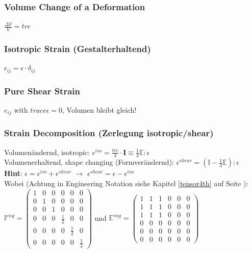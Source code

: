 	\subsubsection{Volume Change of a Deformation}
	$\frac{\Delta V}{V} = tr \epsilon $
	
	\subsubsection{Isotropic Strain (Gestalterhaltend)}
	$\epsilon_{ij} = \epsilon \cdot \delta_{ij} $
	
	\subsubsection{Pure Shear Strain}
	$e_{ij}$ with $trace \epsilon = 0$, Volumen bleibt gleich!
	
	\subsubsection{Strain Decomposition (Zerlegung isotropic/shear)}
	\label{straindecomposition}
	Volumenändernd, isotropic: $\epsilon^{iso} = \frac{tr \epsilon}{3} \cdot \mathbf{I}
	\equiv \frac{1}{3} \mathbb{E} : \epsilon$\\
	
	Volumenerhaltend, shape changing (Formverändernd): $\epsilon^{shear} =
	(\mathbb{I} - \frac{1}{3} \mathbb{E} ) : \epsilon $\\
	\textbf{Hint}: $\epsilon = \epsilon^{iso} + \epsilon^{shear}$ $\rightarrow$
	$\epsilon^{shear} = \epsilon -\epsilon^{iso}$\\
	Wobei (Achtung in Engineering
	Notation siehe Kapitel \ref{tensor4th} auf Seite \pageref{tensor4th}):\\ $ \mathbb{I}^{eng}=
	\begin{pmatrix}
	1 & 0 & 0 & 0 & 0 & 0 \\ 
	0 & 1 & 0 & 0 & 0 & 0 \\ 
	0 & 0 & 1 & 0 & 0 & 0 \\ 
	0 & 0 & 0 & \frac{1}{2} & 0 & 0 \\ 
	0 & 0 & 0 & 0 & \frac{1}{2} & 0 \\ 
	0 & 0 & 0 & 0 & 0 & \frac{1}{2}
	\end{pmatrix} 
	$ und 
	$ \mathbb{E}^{eng}=
	\begin{pmatrix}
	1 & 1 & 1 & 0 & 0 & 0 \\ 
	1 & 1 & 1 & 0 & 0 & 0 \\ 
	1 & 1 & 1 & 0 & 0 & 0 \\ 
	0 & 0 & 0 & 0 & 0 & 0 \\ 
	0 & 0 & 0 & 0 & 0 & 0 \\ 
	0 & 0 & 0 & 0 & 0 & 0
	\end{pmatrix} 
	$
	
